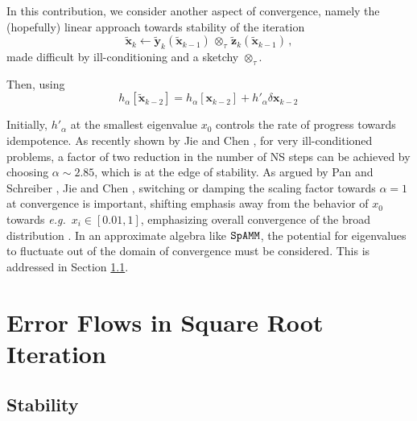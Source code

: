 \documentclass[letterpaper,twocolumn,amsmath,amsfont,amssymb,english,aps,jcp,preprintnumbers,groupaddress,nofootinbib,tightenlines,floatfix]{revtex4}
\newcommand{\mat}[1]{\boldsymbol{#1}}
\newcommand{\ot}{  {\scriptstyle \otimes}_{ \tau } }
\theoremstyle{plain}
\theoremstyle{remark}
\theoremstyle{plain}
\begin{document}
In this contribution, we consider another aspect of convergence,
namely the (hopefully) linear approach towards stability of the
iteration
\begin{equation}
\widetilde{\mat{x}}_k \leftarrow
 \widetilde{\mat{y}}_k \left( \widetilde{\mat{x}}_{k-1} \right)
\, \ot \, \widetilde{\mat{z}}_k \left( \widetilde{\mat{x}}_{k-1} \right) \, ,
\end{equation}
made difficult by ill-conditioning and a sketchy $\ot$.


Then, using
\begin{equation}
  h_\alpha \left[ \widetilde{\mat{x}}_{k-2} \right]
=  h_\alpha \left[ \mat{x}_{k-2} \right] +  h'_\alpha  \delta \mat{x}_{k-2} \, 
\end{equation}


Initially, $h'_\alpha$ at the smallest eigenvalue $x_0$ controls the
rate of progress towards idempotence.  As recently shown by Jie and
Chen \cite{Chen2014}, for very ill-conditioned problems, a factor of
two reduction in the number of NS steps can be achieved by choosing
$\alpha \sim 2.85$, which is at the edge of stability.  As argued by
Pan and Schreiber \cite{Pan1991}, Jie and Chen \cite{Chen2014},
switching or damping the scaling factor towards $\alpha=1$ at
convergence is important, shifting emphasis away from the behavior of
$x_0$ towards {\em e.g.}~$x_i \in [0.01,1]$, emphasizing overall
convergence of the broad distribution \cite{Pan and Scriber}.  In an
approximate algebra like $\tt SpAMM$, the potential for eigenvalues to
fluctuate out of the domain of convergence must be considered.  This
is addressed in Section \ref{}.


\section{Error Flows in Square Root Iteration}

\subsection{Stability}

\end{document}
